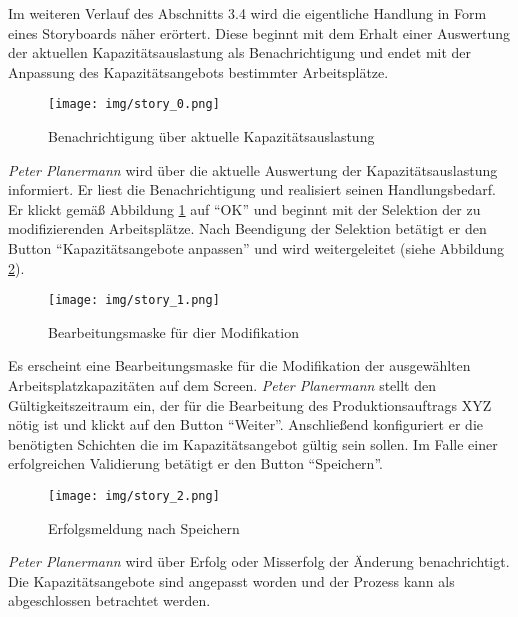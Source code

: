 Im weiteren Verlauf des Abschnitts 3.4 wird die eigentliche Handlung in Form eines Storyboards näher erörtert. Diese beginnt mit dem Erhalt einer Auswertung der aktuellen Kapazitätsauslastung als Benachrichtigung und endet mit der Anpassung des Kapazitätsangebots bestimmter Arbeitsplätze.

\begin{figure}[H]
	\centering 
	\texttt{[image: img/story\_0.png]}
	\caption[Benachrichtigung über aktuelle Kapazitätsauslastung]{\label{fig:story1}Benachrichtigung über aktuelle Kapazitätsauslastung
	}
\end{figure}

\textit{Peter Planermann} wird über die aktuelle Auswertung der Kapazitätsauslastung informiert. Er liest die Benachrichtigung und realisiert seinen Handlungsbedarf. Er klickt gemäß Abbildung \ref{fig:story1} auf \enquote{OK} und beginnt mit der Selektion der zu modifizierenden Arbeitsplätze. Nach Beendigung der Selektion betätigt er den Button \enquote{Kapazitätsangebote anpassen} und wird weitergeleitet (siehe Abbildung \ref{fig:story2}).

\begin{figure}[H]
	\centering 
	\texttt{[image: img/story\_1.png]}
	\caption[Bearbeitungsmaske für dier Modifikation]{\label{fig:story2}Bearbeitungsmaske für dier Modifikation
	}
\end{figure}

Es erscheint eine Bearbeitungsmaske für die Modifikation der ausgewählten Arbeitsplatzkapazitäten auf dem Screen. \textit{Peter Planermann} stellt den Gültigkeitszeitraum ein, der für die Bearbeitung des Produktionsauftrags XYZ nötig ist und klickt auf den Button \enquote{Weiter}. Anschließend konfiguriert er die benötigten Schichten die im Kapazitätsangebot gültig sein sollen. Im Falle einer erfolgreichen Validierung betätigt er den Button \enquote{Speichern}.

\begin{figure}[H]
	\centering 
	\texttt{[image: img/story\_2.png]}
	\caption[Erfolgsmeldung nach Speichern]{\label{fig:story3}Erfolgsmeldung nach Speichern
	}
\end{figure}

\textit{Peter Planermann} wird über Erfolg oder Misserfolg der Änderung benachrichtigt. Die Kapazitätsangebote sind angepasst worden und der Prozess kann als abgeschlossen betrachtet werden.



% 
% 
% 
% 
% 
% 
